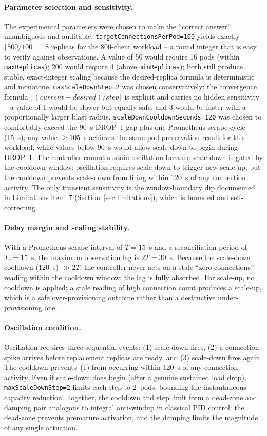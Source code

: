 \documentclass[twocolumn]{svjour3}
\begin{document}
\paragraph{Parameter selection and sensitivity.}
The experimental parameters were chosen to make the ``correct answer'' unambiguous and auditable.  \texttt{targetConnectionsPerPod=100} yields exactly $\lceil800/100\rceil=8$ replicas for the 800-client workload -- a round integer that is easy to verify against observations.  A value of 50 would require 16 pods (within \texttt{maxReplicas}); 200 would require 4 (above \texttt{minReplicas}); both still produce stable, exact-integer scaling because the desired-replica formula is deterministic and monotone.  \texttt{maxScaleDownStep=2} was chosen conservatively: the convergence formula $\lceil(current-desired)/step\rceil$ is explicit and carries no hidden sensitivity -- a value of 1 would be slower but equally safe, and 3 would be faster with a proportionally larger blast radius.  \texttt{scaleDownCooldownSeconds=120} was chosen to comfortably exceed the 90~s DROP~1 gap plus one Prometheus scrape cycle (15~s); any value $\geq 105$~s achieves the same pod-preservation result for this workload, while values below 90~s would allow scale-down to begin during DROP~1.  The controller cannot sustain oscillation because scale-down is gated by the cooldown window: oscillation requires scale-down to trigger new scale-up, but the cooldown prevents scale-down from firing within 120~s of any connection activity.  The only transient sensitivity is the window-boundary dip documented in Limitations item~7 (Section~\ref{sec:limitations}), which is bounded and self-correcting.

\paragraph{Delay margin and scaling stability.}
With a Prometheus scrape interval of $T=15$~s and a reconciliation period of $T_r=15$~s, the maximum observation lag is $2T=30$~s.  Because the scale-down cooldown (120~s) $\gg 2T$, the controller never acts on a stale ``zero connections'' reading within the cooldown window: the lag is fully absorbed.  For scale-up, no cooldown is applied; a stale reading of high connection count produces a scale-up, which is a safe over-provisioning outcome rather than a destructive under-provisioning one.

\paragraph{Oscillation condition.}
Oscillation requires three sequential events: (1) scale-down fires, (2) a connection spike arrives before replacement replicas are ready, and (3) scale-down fires again.  The cooldown prevents~(1) from occurring within 120~s of any connection activity.  Even if scale-down does begin (after a genuine sustained load drop), \texttt{maxScaleDownStep=2} limits each step to 2~pods, bounding the instantaneous capacity reduction.  Together, the cooldown and step limit form a dead-zone and damping pair analogous to integral anti-windup in classical PID control: the dead-zone prevents premature activation, and the damping limits the magnitude of any single actuation.
\end{document}
